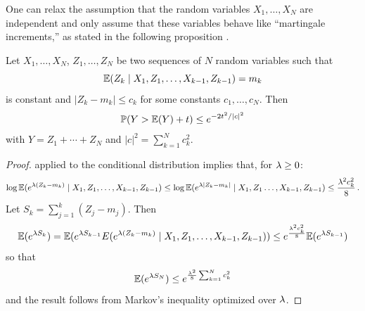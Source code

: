 One can  relax the assumption that the random variables $X_1, \ldots, X_N$ are independent and only assume that these variables behave like ``martingale increments,'' as stated in the following proposition \citep{dembo2011large}.
\begin{proposition}
\label{prop:martingale.0}
Let $X_1, \ldots, X_N$, $Z_1, \ldots, Z_N$ be two sequences of $N$ random variables such that 
\[
\bm{\mathbb E}(Z_k\mid X_1,Z_1, \ldots, X_{k-1}, Z_{k-1}) = m_k
\]
is constant and  $|Z_k - m_k| \leq c_k$ for some constants $c_1, \ldots, c_N$. Then
\[
\bm{\mathbb P}(Y > \bm{\mathbb E}(Y) +t) \leq e^{- 2t^2/|c|^2}
\]
with $Y=Z_1+\cdots + Z_N$ and $|c|^2 = \sum_{k=1}^N c_k^2$.

\end{proposition}
\begin{proof}
  applied to the conditional distribution implies that, for $\lambda\geq 0$:
\[
\log \bm{\mathbb E}(e^{\lambda (Z_k-m_k)}\mid X_1,Z_1, \ldots, X_{k-1}, Z_{k-1}) \leq \log \bm{\mathbb E}(e^{\lambda |Z_k-m_k|}\mid X_1,Z_1 \ldots, X_{k-1}, Z_{k-1})\leq  \frac{\lambda^2 c_k^2}8\,.
\]
Let $S_k = \sum_{j=1}^k (Z_j- m_j)$. Then
\[
\bm{\mathbb E}(e^{\lambda S_k}) = \bm{\mathbb E}(e^{\lambda S_{k-1}}E(e^{\lambda (Z_k-m_k)}\mid X_1,Z_1, \ldots, X_{k-1}, Z_{k-1})) \leq e^{\frac{\lambda^2 c_k^2}8} \bm{\mathbb E}(e^{\lambda S_{k-1}})
\]
so that 
\[
\bm{\mathbb E}(e^{\lambda S_N})\leq e^{\frac{\lambda^2}8 \sum_{k=1}^N c_k^2}
\]
and the result follows from Markov's inequality optimized over $\lambda$.
\end{proof}




